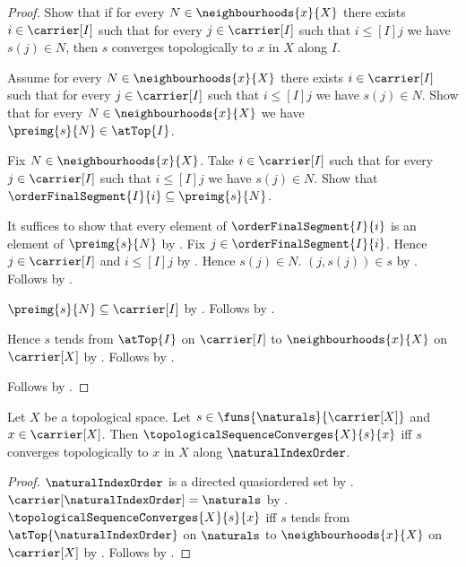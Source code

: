 \begin{proof}
    Show that if for every $N\in\neighbourhoods{x}{X}$ there exists
        $i\in\carrier[I]$ such that for every $j\in\carrier[I]$
        such that $i\mathrel{\leq[I]}j$ we have $s(j)\in N$, then
        $s$ converges topologically to $x$ in $X$ along $I$.
    \begin{subproof}
        Assume for every $N\in\neighbourhoods{x}{X}$ there exists
            $i\in\carrier[I]$ such that for every $j\in\carrier[I]$
            such that $i\mathrel{\leq[I]}j$ we have $s(j)\in N$.
        Show that for every $N\in\neighbourhoods{x}{X}$ we have
            $\preimg{s}{N}\in\atTop{I}$.
        \begin{subproof}
            Fix $N\in\neighbourhoods{x}{X}$.
            Take $i\in\carrier[I]$ such that for every
                $j\in\carrier[I]$ such that $i\mathrel{\leq[I]}j$
                we have $s(j)\in N$.
            Show that $\orderFinalSegment{I}{i}\subseteq\preimg{s}{N}$.
            \begin{subproof}
                It suffices to show that every element of
                    $\orderFinalSegment{I}{i}$ is an element of
                    $\preimg{s}{N}$ by .
                Fix $j\in\orderFinalSegment{I}{i}$.
                Hence $j\in\carrier[I]$ and
                    $i\mathrel{\leq[I]}j$ by
                    .
                Hence $s(j)\in N$.
                $(j,s(j))\in s$ by
                    .
                Follows by .
            \end{subproof}
            $\preimg{s}{N}\subseteq\carrier[I]$ by
                .
            Follows by .
        \end{subproof}
        Hence $s$ tends from $\atTop{I}$ on $\carrier[I]$ to
            $\neighbourhoods{x}{X}$ on $\carrier[X]$ by
            .
        Follows by .
    \end{subproof}
    Follows by \auto.
\end{proof}

\begin{theorem}\label{sequence_convergence_is_net_convergence}
    Let $X$ be a topological space.
    Let $s\in\funs{\naturals}{\carrier[X]}$ and $x\in\carrier[X]$.
    Then $\topologicalSequenceConverges{X}{s}{x}$ iff
        $s$ converges topologically to $x$ in $X$ along
            $\naturalIndexOrder$.
\end{theorem}
\begin{proof}
    $\naturalIndexOrder$ is a directed quasiordered set by
        .
    $\carrier[\naturalIndexOrder]=\naturals$ by
        .
    $\topologicalSequenceConverges{X}{s}{x}$ iff
        $s$ tends from $\atTop{\naturalIndexOrder}$ on $\naturals$ to
            $\neighbourhoods{x}{X}$ on $\carrier[X]$ by
        .
    Follows by .
\end{proof}
